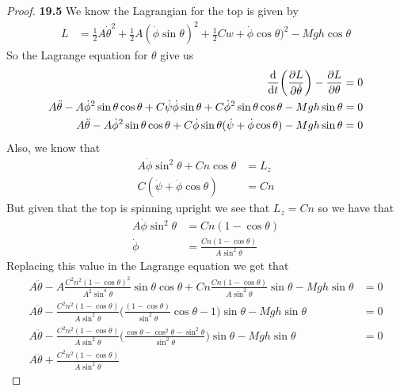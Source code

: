\documentclass[11pt]{article}
\theoremstyle{definition}
\begin{document}
\begin{proof}{\textbf{19.5}}
    We know the Lagrangian for the top is given by
    \begin{align*}
        L &= \frac{1}{2} A \dot\theta^2 + \frac{1}{2} A (\dot\phi\sin\theta)^2
        + \frac{1}{2}Cw+ \dot\phi\cos\theta)^2 - Mgh\cos\theta
    \end{align*}
    So the Lagrange equation for $\theta$ give us 
    \begin{align*}
        \derivative{}{t}\bigg(\partialderivative{L}{\dot\theta}\bigg) -
        \partialderivative{L}{\theta} = 0\\
        A\ddot\theta - A \dot\phi^2\sin\theta\cos\theta
        + C\dot\psi\dot\phi\sin\theta
        + C\dot\phi^2\sin\theta\cos\theta - Mgh\sin\theta
        = 0\\
        A\ddot\theta - A \dot\phi^2\sin\theta\cos\theta
        + C\dot\phi\sin\theta(\dot\psi
        + \dot\phi\cos\theta) - Mgh\sin\theta
        = 0
    \end{align*}
    Also, we know that
    \begin{align*}
        A\dot\phi\sin^2\theta + Cn\cos\theta
        &= L_z\\
        C(\dot\psi + \dot\phi\cos\theta) &= Cn
    \end{align*}
    But given that the top is spinning upright we see that $L_z = Cn$
    so we have that
    \begin{align*}
        A\dot\phi\sin^2\theta &= Cn(1 - \cos\theta)\\
        \dot\phi &= \frac{Cn(1 - \cos\theta)}{A\sin^2\theta}
    \end{align*}
    Replacing this value in the Lagrange equation we get that
    \begin{align*}
        A\ddot\theta - A \frac{C^2n^2(1 - \cos\theta)^2}{A^2 \sin^4\theta}
        \sin\theta\cos\theta
        + Cn\frac{Cn(1 - \cos\theta)}{A\sin^2\theta}\sin\theta - Mgh\sin\theta
        &= 0\\
        A\ddot\theta - \frac{C^2n^2(1 - \cos\theta)}{A \sin^2\theta}
        \bigg(
            \frac{(1 - \cos\theta)}{\sin^2\theta}\cos\theta
            - 1
        \bigg)\sin\theta
        - Mgh\sin\theta
        &= 0\\
        A\ddot\theta - \frac{C^2n^2(1 - \cos\theta)}{A \sin^2\theta}
        \bigg(
            \frac{\cos\theta - \cos^2\theta - \sin^2\theta}{\sin^2\theta}
        \bigg)\sin\theta
        - Mgh\sin\theta
        &= 0\\
        A\ddot\theta + \frac{C^2n^2(1 - \cos\theta)}{A \sin^2\theta}

\end{align*}
\end{proof}
\end{document}

